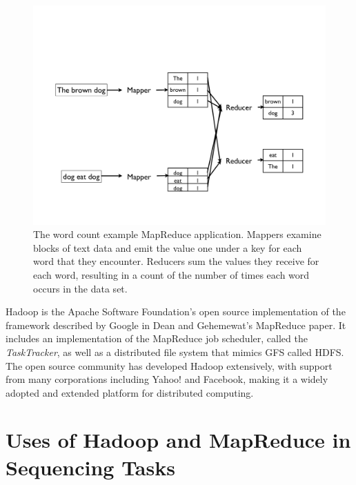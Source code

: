 \begin{figure}
\centering
\includegraphics[width=1\textwidth,trim=0in 1in 0in 3in,clip]{figures/mapreduce_example.pdf}
\caption[The word count example MapReduce application.]{The word count example MapReduce application. Mappers examine blocks of text data and emit the value one under a key for each word that they encounter. Reducers sum the values they receive for each word, resulting in a count of the number of times each word occurs in the data set.}
\label{mapreduce_example}
\end{figure}

Hadoop is the Apache Software Foundation's open source implementation of the framework described by Google in Dean and Gehemewat's MapReduce paper. It includes an implementation of the MapReduce job scheduler, called the \emph{TaskTracker}, as well as a distributed file system that mimics GFS called HDFS. The open source community has developed Hadoop extensively, with support from many corporations including Yahoo! and Facebook, making it a widely adopted and extended platform for distributed computing.

\section{Uses of Hadoop and MapReduce in Sequencing Tasks}\label{section_mapred_related_work}

